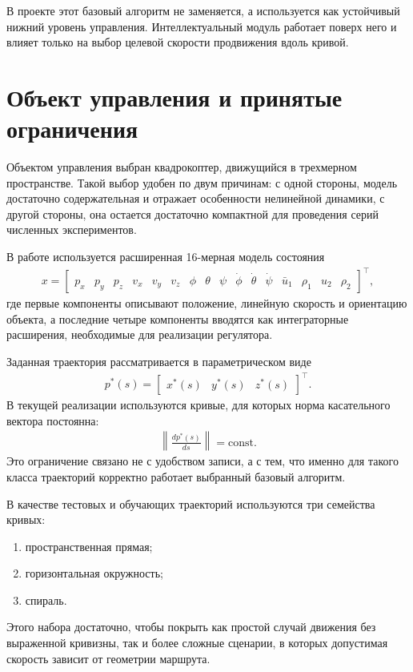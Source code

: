 В проекте этот базовый алгоритм не заменяется, а используется как устойчивый нижний уровень управления. Интеллектуальный модуль работает поверх него и влияет только на выбор целевой скорости продвижения вдоль кривой.

\section{Объект управления и принятые ограничения}

Объектом управления выбран квадрокоптер, движущийся в трехмерном пространстве. Такой выбор удобен по двум причинам: с одной стороны, модель достаточно содержательная и отражает особенности нелинейной динамики, с другой стороны, она остается достаточно компактной для проведения серий численных экспериментов.

В работе используется расширенная 16-мерная модель состояния
\begin{gather}
    x =
    \begin{bmatrix}
        p_x & p_y & p_z &
        v_x & v_y & v_z &
        \phi & \theta & \psi &
        \dot{\phi} & \dot{\theta} & \dot{\psi} &
        \bar{u}_1 & \rho_1 & u_2 & \rho_2
    \end{bmatrix}^{\top},
\end{gather}
где первые компоненты описывают положение, линейную скорость и ориентацию объекта, а последние четыре компоненты вводятся как интеграторные расширения, необходимые для реализации регулятора.

Заданная траектория рассматривается в параметрическом виде
\begin{gather}
    p^{\ast}(s) = \begin{bmatrix} x^{\ast}(s) & y^{\ast}(s) & z^{\ast}(s) \end{bmatrix}^{\top}.
\end{gather}
В текущей реализации используются кривые, для которых норма касательного вектора постоянна:
\begin{gather}
    \left\|\frac{d p^{\ast}(s)}{d s}\right\| = \mathrm{const}.
\end{gather}
Это ограничение связано не с удобством записи, а с тем, что именно для такого класса траекторий корректно работает выбранный базовый алгоритм.

В качестве тестовых и обучающих траекторий используются три семейства кривых:
\begin{enumerate}
    \item пространственная прямая;
    \item горизонтальная окружность;
    \item спираль.
\end{enumerate}
Этого набора достаточно, чтобы покрыть как простой случай движения без выраженной кривизны, так и более сложные сценарии, в которых допустимая скорость зависит от геометрии маршрута.

